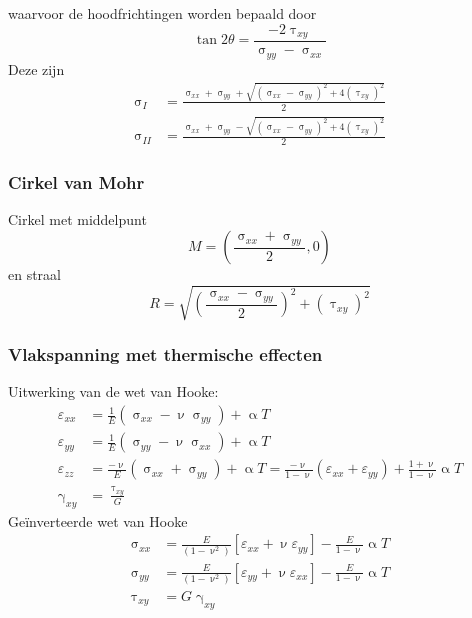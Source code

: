                 waarvoor de hoodfrichtingen worden bepaald door
                \begin{equation}
                    \tan2\theta = \frac{-2\uptau_{xy}}{\upsigma_{yy}-\upsigma_{xx}}
                \end{equation}
                Deze zijn
                \begin{align}
                    \upsigma_I &= \frac{\upsigma_{xx}+\upsigma_{yy}+\sqrt{(\upsigma_{xx}-\upsigma_{yy})^2+4(\uptau_{xy})^2}}{2}\nonumber\\
                    \upsigma_{II} &= \frac{\upsigma_{xx}+\upsigma_{yy}-\sqrt{(\upsigma_{xx}-\upsigma_{yy})^2+4(\uptau_{xy})^2}}{2}
                \end{align}

            \subsubsection{Cirkel van Mohr}

                Cirkel met middelpunt
                \begin{equation}
                    M = \left(\frac{\upsigma_{xx}+\upsigma_{yy}}{2},0\right)
                \end{equation}
                en straal
                \begin{equation}
                    R = \sqrt{\left(\frac{\upsigma_{xx}-\upsigma_{yy}}{2}\right)^2+(\uptau_{xy})^2}
                \end{equation}

            \subsubsection{Vlakspanning met thermische effecten}
                
                Uitwerking van de wet van Hooke:
                \begin{align}
                    \varepsilon_{xx} &= \frac{1}{E}\left(\upsigma_{xx} - \upnu\upsigma_{yy}\right) +\upalpha T\nonumber\\
                    \varepsilon_{yy} &= \frac{1}{E}\left(\upsigma_{yy} - \upnu\upsigma_{xx}\right) +\upalpha T\nonumber\\
                    \varepsilon_{zz} &= \frac{-\upnu}{E}\left(\upsigma_{xx}+\upsigma_{yy}\right) +\upalpha T = \frac{-\upnu}{1-\upnu}\left(\varepsilon_{xx}+\varepsilon_{yy}\right)+\frac{1+\upnu}{1-\upnu}\upalpha T\\
                    \upgamma_{xy} &= \frac{\uptau_{xy}}{G}\nonumber
                \end{align}
                Geïnverteerde wet van Hooke
                \begin{align}
                    \upsigma_{xx} &= \frac{E}{(1-\upnu^2)}\left[\varepsilon_{xx}+\upnu\varepsilon_{yy}\right]-\frac{E}{1-\upnu}\upalpha T\nonumber\\
                    \upsigma_{yy} &= \frac{E}{(1-\upnu^2)}\left[\varepsilon_{yy}+\upnu\varepsilon_{xx}\right]-\frac{E}{1-\upnu}\upalpha T\\
                    \uptau_{xy} &= G\upgamma_{xy}\nonumber
                \end{align}
        
